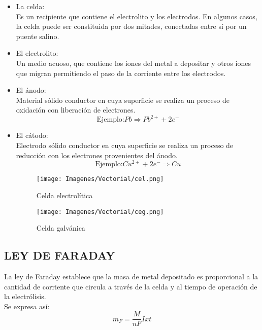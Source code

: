 \begin{itemize}
 \item La celda: \\
 Es un recipiente que contiene el electrolito y los electrodos. En algunos casos, la celda puede ser constituida por dos mitades, conectadas entre s\'i por un puente salino.
 \item El electrolito: \\
Un medio acuoso, que contiene los iones del metal a depositar y    otros iones que migran permitiendo el paso de la corriente entre los electrodos.
 \item El \'anodo: \\
Material s\'olido conductor en cuya superficie se realiza un proceso de oxidaci\'on con liberaci\'on de electrones. 
\begin{equation}
 \text{Ejemplo:} Pb \Rightarrow Pb^{2+} + 2e^-
\end{equation}
 \item El c\'atodo:\\ 
Electrodo s\'olido conductor en cuya superficie se realiza un proceso de reducci\'on con los electrones provenientes del \'anodo.
 \begin{equation}
 \text{Ejemplo:}   Cu^{2+}+ 2e^- \Rightarrow Cu
 \end{equation}
\begin{figure}[H]
 \centering
 \texttt{[image: Imagenes/Vectorial/cel.png]}
 \caption{Celda electrol\'itica}
 \label{fig:cel}
\end{figure}

 \begin{figure}[H]
 \centering
 \texttt{[image: Imagenes/Vectorial/ceg.png]}
 \caption{Celda galv\'anica}
 \label{fig:ceg}
\end{figure}
\end{itemize}

\subsection{LEY DE FARADAY}

La ley de Faraday establece que la masa de metal depositado es proporcional a la cantidad de corriente que circula a trav\'es de la celda y al tiempo de operaci\'on de la electr\'olisis.\\
Se expresa as\'i:
\begin{equation}
 m_F=\frac{M}{nF}Ixt
\end{equation}

